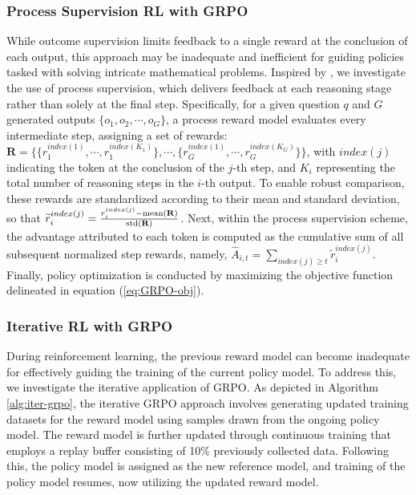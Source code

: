\begin{itemize}[topsep=0pt]
\begin{itemize}[topsep=0pt]
\subsubsection{Process Supervision RL with GRPO}  
While outcome supervision limits feedback to a single reward at the conclusion of each output, this approach may be inadequate and inefficient for guiding policies tasked with solving intricate mathematical problems. Inspired by \cite{wang2023math}, we investigate the use of process supervision, which delivers feedback at each reasoning stage rather than solely at the final step. Specifically, for a given question $q$ and $G$ generated outputs $\{o_1, o_2, \cdots, o_G\}$, a process reward model evaluates every intermediate step, assigning a set of rewards: $\mathbf{R} = \{ \{r_1^{index(1)},\cdots,r_1^{index(K_1)}\}, \cdots,  \{r_G^{index(1)},\cdots,r_G^{index(K_G)}\} \}$, with $index(j)$ indicating the token at the conclusion of the $j$-th step, and $K_i$ representing the total number of reasoning steps in the $i$-th output. To enable robust comparison, these rewards are standardized according to their mean and standard deviation, so that $\widetilde{r}_i^{index(j)} = \frac{r_i^{index(j)} - {\rm mean(\mathbf{R})}}{{\rm std(\mathbf{R})}}$.  
Next, within the process supervision scheme, the advantage attributed to each token is computed as the cumulative sum of all subsequent normalized step rewards, namely, $\hat{A}_{i, t} = \sum_{index(j) \ge t} \widetilde{r}_i^{index(j)}$.
Finally, policy optimization is conducted by maximizing the objective function delineated in equation (\ref{eq:GRPO-obj}).

\subsubsection{Iterative RL with GRPO} During reinforcement learning, the previous reward model can become inadequate for effectively guiding the training of the current policy model. To address this, we investigate the iterative application of GRPO. As depicted in Algorithm \ref{alg:iter-grpo}, the iterative GRPO approach involves generating updated training datasets for the reward model using samples drawn from the ongoing policy model. The reward model is further updated through continuous training that employs a replay buffer consisting of 10\% previously collected data. Following this, the policy model is assigned as the new reference model, and training of the policy model resumes, now utilizing the updated reward model.


\end{itemize}
\end{itemize}
